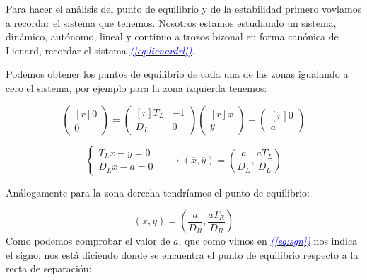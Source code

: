 \documentclass[12pt,a4paper]{report} %
\newcommand{\eref}[1]{\hyperref[#1]{\textcolor{blue}{\textit{(\ref*{#1})}}}}
\begin{document}
		\vspace{0.5cm}Para hacer el análisis del punto de equilibrio y de la estabilidad primero vovlamos a recordar el sistema que tenemos. Nosotros estamos estudiando un sistema, dinámico, autónomo, lineal y continuo a trozos bizonal en forma canónica de Lienard, recordar el sistema \eref{eq:lienardrl}.
		
		\vspace{0.5cm}Podemos obtener los puntos de equilibrio de cada una de las zonas igualando a cero el sistema, por ejemplo para la zona izquierda tenemos:

		
		\begin{equation*}
			\begin{pmatrix*}[r]
				0\\ 0
			\end{pmatrix*}= \begin{pmatrix*}[r]
				T_L & -1 \\ D_L & 0
			\end{pmatrix*} \begin{pmatrix*}[r]
				x \\ y
			\end{pmatrix*}+\begin{pmatrix*}[r]
				0 \\ a
			\end{pmatrix*}
		\end{equation*}\smallskip
		
		\begin{equation}
			\label{eq:eqpointL}
			\left\{
			\begin{aligned}
				T_Lx-y=0\\
				D_Lx-a=0
			\end{aligned}
			\right. \quad \longrightarrow \left( \overline{x},\overline{y} \right)=\left( \frac{a}{D_L},\frac{aT_L}{D_L} \right)
		\end{equation}\smallskip
		
		Análogamente para la zona derecha tendríamos el punto de equilibrio:
		
		\begin{equation}
			\label{eq:eqpointR}
			\left( \overline{x},\overline{y} \right)=\left( \frac{a}{D_R},\frac{aT_R}{D_R} \right)
		\end{equation}\smallskip
		\newpage
		Como podemos comprobar el valor de $a$, que como vimos en \eref{eq:sgn} nos indica el signo, nos está diciendo donde se encuentra el punto de equilibrio respecto a la recta de separación:
		
\end{document}
